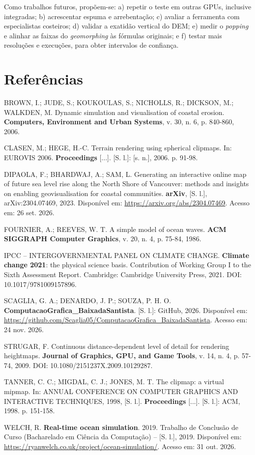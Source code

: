\documentclass[conference]{IEEEtran}
\begin{document}
Como trabalhos futuros, propõem-se: a) repetir o teste em outras GPUs, inclusive integradas; b) acrescentar espuma e arrebentação; c) avaliar a ferramenta com especialistas costeiros; d) validar a exatidão vertical do DEM; e) medir o \emph{popping} e alinhar as faixas do \emph{geomorphing} às fórmulas originais; e f) testar mais resoluções e execuções, para obter intervalos de confiança.

\section*{Referências}
\begingroup
\footnotesize
\raggedright
\setlength{\parindent}{0pt}
\setlength{\parskip}{4pt}

BROWN, I.; JUDE, S.; KOUKOULAS, S.; NICHOLLS, R.; DICKSON, M.; WALKDEN,
M. Dynamic simulation and visualisation of coastal erosion. \textbf{Computers,
Environment and Urban Systems}, v. 30, n. 6, p. 840-860, 2006.

CLASEN, M.; HEGE, H.-C. Terrain rendering using spherical clipmaps. In:
EUROVIS 2006. \textbf{Proceedings} [...]. [S. l.]: [s. n.], 2006. p. 91-98.

DIPAOLA, F.; BHARDWAJ, A.; SAM, L. Generating an interactive online map of
future sea level rise along the North Shore of Vancouver: methods and
insights on enabling geovisualisation for coastal communities. \textbf{arXiv},
[S. l.], arXiv:2304.07469, 2023. Disponível em:
\url{https://arxiv.org/abs/2304.07469}. Acesso em: 26 set. 2026.

FOURNIER, A.; REEVES, W. T. A simple model of ocean waves. \textbf{ACM
SIGGRAPH Computer Graphics}, v. 20, n. 4, p. 75-84, 1986.

IPCC -- INTERGOVERNMENTAL PANEL ON CLIMATE CHANGE. \textbf{Climate change 2021}: the
physical science basis. Contribution of Working Group I to the Sixth Assessment
Report. Cambridge: Cambridge University Press, 2021. DOI: 10.1017/9781009157896.

SCAGLIA, G. A.; DENARDO, J. P.; SOUZA, P. H. O. \textbf{ComputacaoGrafica\_BaixadaSantista}. [S. l.]: GitHub, 2026. Disponível em:
\url{https://github.com/Scaglia05/ComputacaoGrafica_BaixadaSantista}. Acesso em: 24 nov. 2026.

STRUGAR, F. Continuous distance-dependent level of detail for rendering
heightmaps. \textbf{Journal of Graphics, GPU, and Game Tools}, v. 14, n. 4,
p. 57-74, 2009. DOI: 10.1080/2151237X.2009.10129287.

TANNER, C. C.; MIGDAL, C. J.; JONES, M. T. The clipmap: a virtual mipmap.
In: ANNUAL CONFERENCE ON COMPUTER GRAPHICS AND INTERACTIVE TECHNIQUES,
1998, [S. l.]. \textbf{Proceedings} [...]. [S. l.]: ACM, 1998. p. 151-158.

WELCH, R. \textbf{Real-time ocean simulation}. 2019. Trabalho de Conclusão de
Curso (Bacharelado em Ciência da Computação) -- [S. l.], 2019. Disponível em:
\url{https://ryanwelch.co.uk/project/ocean-simulation/}. Acesso em: 31 out. 2026.
\endgroup
\end{document}
